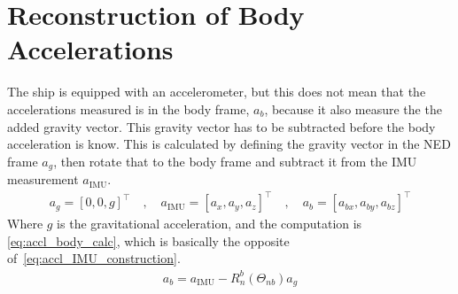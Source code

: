 \section{Reconstruction of Body Accelerations}
The ship is equipped with an accelerometer, but this does not mean that the accelerations measured is in the body frame, $a_b$, because it also measure the the added gravity vector. This gravity vector has to be subtracted before the body acceleration is know. This is calculated by defining the gravity vector in the NED frame $a_g$, then rotate that to the body frame and subtract it from the IMU measurement $a_\text{IMU}$.
\begin{align}
a_g = [0, 0, g]^\top \quad, \quad 
a_\text{IMU} = [a_x, a_y, a_z]^\top \quad, \quad 
a_b = [a_{bx}, a_{by}, a_{bz}]^\top
\end{align}
Where $g$ is the gravitational acceleration, and the computation is \vref{eq:accl_body_calc}, which is basically the opposite of~\vref{eq:accl_IMU_construction}.
\begin{align}
a_b = a_\text{IMU} - R_n^b (\Theta_{nb}) a_g
\label{eq:accl_body_calc}
\end{align}
